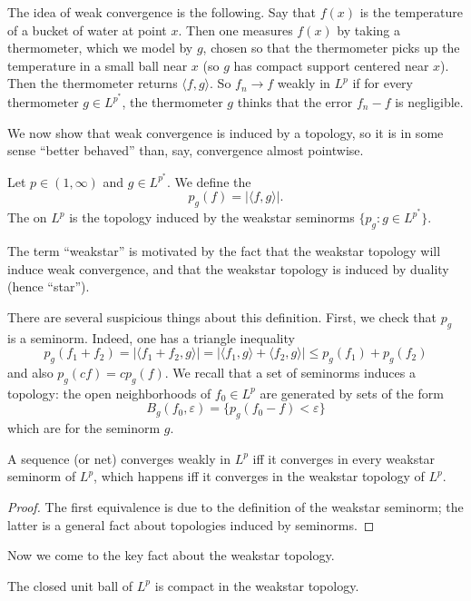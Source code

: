The idea of weak convergence is the following. Say that $f(x)$ is the temperature of a bucket of water at point $x$.
Then one measures $f(x)$ by taking a thermometer, which we model by $g$, chosen so that the thermometer picks up the temperature in a small ball near $x$ (so $g$ has compact support centered near $x$).
Then the thermometer returns $\langle f, g\rangle$.
So $f_{n} \to f$ weakly in $L^p$ if for every thermometer $g \in L^{p^*}$, the thermometer $g$ thinks that the error $f_{n} - f$ is negligible.

We now show that weak convergence is induced by a topology, so it is in some sense ``better behaved'' than, say, convergence almost pointwise.

\begin{definition}
Let $p \in (1, \infty)$ and $g \in L^{p^*}$.
We define the 
\[p_g(f) = |\langle f, g\rangle|.\]
The  on $L^p$ is the topology induced by the weakstar seminorms $\{p_g: g \in L^{p^*}\}$.
\end{definition}

The term ``weakstar'' is motivated by the fact that the weakstar topology will induce weak convergence, and that the weakstar topology is induced by duality (hence ``star'').

There are several suspicious things about this definition. First, we check that $p_g$ is a seminorm. Indeed, one has a triangle inequality
\[p_g(f_1 + f_2) = |\langle f_1 + f_2, g\rangle| = |\langle f_1, g\rangle + \langle f_2, g\rangle| \leq p_g(f_1) + p_g(f_2)\]
and also $p_g(cf) = cp_g(f)$.
We recall that a set of seminorms induces a topology: the open neighborhoods of $f_0 \in L^p$ are generated by sets of the form
\[B_g(f_0, \varepsilon) = \{p_g(f_0 - f) < \varepsilon\}\]
which are  for the seminorm $g$.

\begin{lemma}
A sequence (or net) converges weakly in $L^p$ iff it converges in every weakstar seminorm of $L^p$, which happens iff it converges in the weakstar topology of $L^p$.
\end{lemma}
\begin{proof}
The first equivalence is due to the definition of the weakstar seminorm; the latter is a general fact about topologies induced by seminorms.
\end{proof}

Now we come to the key fact about the weakstar topology.

\begin{theoremx}
The closed unit ball of $L^p$ is compact in the weakstar topology.
\end{theoremx}


